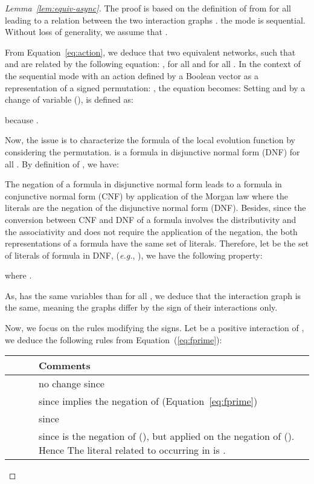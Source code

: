 \documentclass[12pt]{elsarticle}
\newcommand{\abbrev}[1]{#1, \relax}
\newcommand{\eg}[0]{\abbrev{\textit{e.g.}}}
\begin{document}
\begin{proof}[Lemma~\ref{lem:equiv-async}]
The proof is based on the definition of  from  for all  leading to a relation between the two interaction graphs . the mode  is sequential. Without loss of generality, we assume that .

\medskip
\noindent
From Equation~\ref{eq:action}, we deduce that two equivalent networks,  such that  and  are related by the following equation:  , for all  and for all . In the context of the sequential mode with an action defined by a Boolean vector as a representation of a signed permutation: ,
the equation becomes: 
Setting  and by a change of variable (),  is defined as:

because .

 Now, the issue is to characterize the formula of the local evolution function  by considering the permutation.
  is a formula in disjunctive normal form (DNF) for all . By definition of , we have:

																																										
The negation of a formula in disjunctive normal form leads to a formula in conjunctive normal form (CNF) by application of the Morgan law where the literals are the negation of the disjunctive normal form (DNF).
Besides, since the conversion between CNF and DNF of a formula involves the distributivity and the associativity and does not require the application of the negation, the both representations of a formula have the same set of literals. Therefore, 
let  be the set of literals of formula  in DNF, (\eg ), we have the following property: 

 where .
	
\noindent
As,  has the same variables than  for all , we deduce that the interaction graph is the same, meaning the graphs differ by the sign of their interactions only.

\medskip
\noindent
Now, we focus on the rules modifying the signs.
 Let  be a positive interaction of , we deduce the following rules from Equation~(\ref{eq:fprime}): 

\begin{center}
\begin{tabular}{ c c c p{}}
  &  &  & Comments\\
\hline
 &  &  & no change since \\
 &  &  & since  implies the negation of  (Equation~\ref{eq:fprime}) \\
 &  &  & since  \\
 &  &  & since  is the negation of  (), but applied on the negation of  (). Hence 
The literal related to  occurring in  is . \\
\hline
\end{tabular}
\end{center}


\end{proof}
\end{document}
